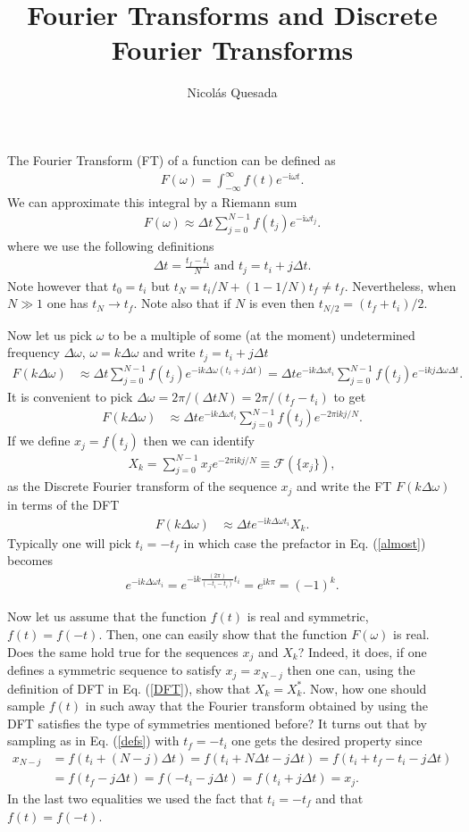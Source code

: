 \documentclass[11pt,letterpaper]{article}
\title{Fourier Transforms and Discrete Fourier Transforms}
\author{Nicol\'as Quesada}
\newcommand{\ii}{\mathrm{i}}
\newcommand{\eq}[1]{\begin{align}#1\end{align}}
\begin{document}
\maketitle
The Fourier Transform (FT) of a function can be defined as
\eq{
F(\omega)=\int_{-\infty}^\infty f(t) e^{-\ii \omega t}.
}
We can approximate this integral by a Riemann sum
\eq{
F(\omega) \approx \Delta t \sum_{j=0}^{N-1} f(t_j) e^{-\ii \omega t_j}.
}
where we use the following definitions
\eq{\label{defs}
\Delta t=\frac{t_f-t_i}{N} \text{ and } t_j=t_i+j \Delta t.
}
Note however that $t_0=t_i$ but $t_N=t_i/N+(1-1/N) t_f \neq t_f$. Nevertheless, when $N \gg 1$ one has $t_N \to t_f$. Note also that if $N$ is even then $t_{N/2}=(t_f+t_i)/2$. 

Now let us pick $\omega$ to be a multiple of some (at the moment) undetermined frequency $\Delta \omega$, $\omega=k \Delta \omega$ and write $t_j=t_i+j \Delta t$
\eq{
F(k \Delta \omega)&\approx \Delta t\sum_{j=0}^{N-1} f(t_j) e^{-\ii k \Delta \omega (t_i+j \Delta t)}=\Delta t e^{-\ii k \Delta \omega t_i}\sum_{j=0}^{N-1} f(t_j) e^{-\ii k j \Delta \omega  \Delta t}.
}
It is convenient to pick $\Delta \omega = 2 \pi/(\Delta t N)=2 \pi /(t_f-t_i)$ to get
\eq{\label{almost}
F(k \Delta \omega)&\approx \Delta t e^{-\ii k \Delta \omega t_i}\sum_{j=0}^{N-1} f(t_j) e^{-2 \pi \ii k  j/N}.
}
If we define $x_j=f(t_j)$ then we can identify
\eq{\label{DFT}
X_k=\sum_{j=0}^{N-1} x_j e^{-2 \pi \ii k  j/N}\equiv \mathcal{F}\left(\{x_j \}\right),
}
as the Discrete Fourier transform of the sequence $x_j$ and write the FT  $F(k \Delta \omega)$ in terms of the DFT
\eq{\label{quasi}
F(k \Delta \omega)&\approx \Delta t e^{-\ii k \Delta \omega t_i} X_k.
}
Typically one will pick $t_i=-t_f$ in which case the prefactor in Eq. (\ref{almost}) becomes
\eq{
e^{-\ii k \Delta \omega t_i}=e^{-\ii k \frac{(2 \pi)}{(-t_i-t_i)} t_i}=e^{\ii k \pi}=(-1)^k.
}

Now let us assume that the function $f(t)$ is real and symmetric, $f(t)=f(-t)$. Then, one can easily show that the function $F(\omega)$ is real. Does the same hold true for the sequences $x_j$ and $X_k$? Indeed, it does, if one defines a symmetric sequence to satisfy $x_j=x_{N-j}$ then one can, using the definition of DFT in Eq. (\ref{DFT}), show that $X_k=X_k^*$. Now, how one should sample $f(t)$ in such away that the Fourier transform obtained by using the DFT satisfies the type of symmetries mentioned before?
It turns out that by sampling as in Eq. (\ref{defs}) with $t_f=-t_i$ one gets the desired property since
\eq{
x_{N-j}&=f(t_i+(N-j)\Delta t)=f(t_i+N\Delta t-j\Delta t)=f(t_i+t_f-t_i-j \Delta t  )\\
&=f(t_f-j\Delta t )=f(-t_i-j \Delta t )=f(t_i+j \Delta t )=x_j. \nonumber
}
In the last two equalities we used the fact that $t_i=-t_f$ and that $f(t)=f(-t)$.
\end{document}
